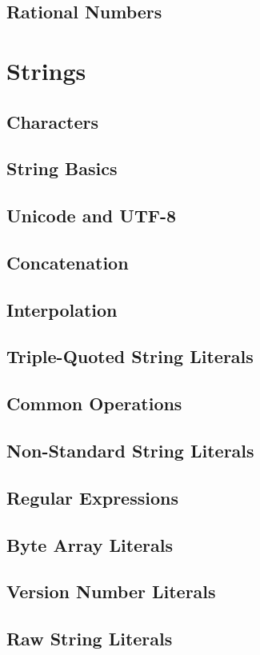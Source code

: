     \section{Rational Numbers}
\chapter{Strings}
    \section{Characters}
    \section{String Basics}
    \section{Unicode and UTF-8}
    \section{Concatenation}
    \section{Interpolation}
    \section{Triple-Quoted String Literals}
    \section{Common Operations}
    \section{Non-Standard String Literals}
    \section{Regular Expressions}
    \section{Byte Array Literals}
    \section{Version Number Literals}
    \section{Raw String Literals}
